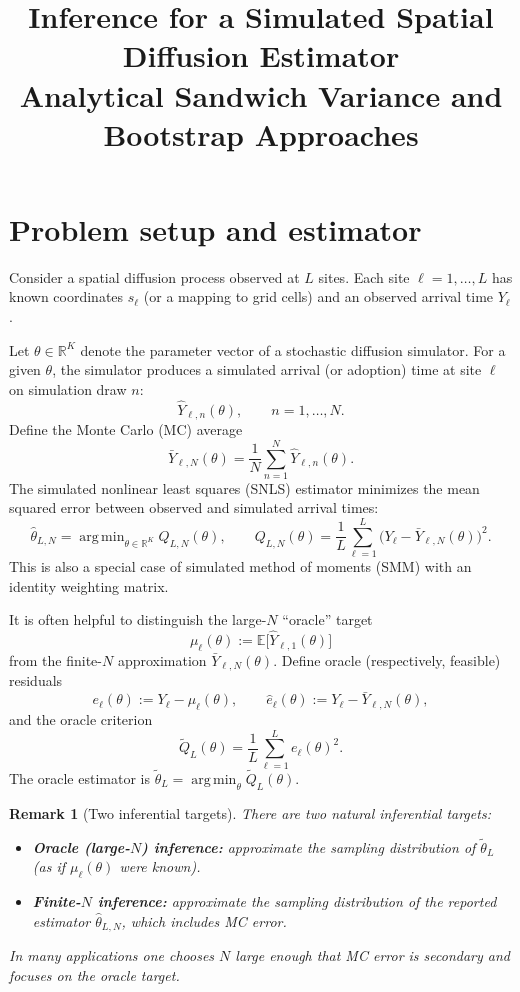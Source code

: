 \documentclass[11pt]{article}
\title{\textbf{Inference for a Simulated Spatial Diffusion Estimator}\\[0.35em]
\large Analytical Sandwich Variance and Bootstrap Approaches}
\author{}
\date{}
\newtheorem{remark}{Remark}
\DeclareMathOperator*{\argmin}{arg\,min}
\newcommand{\E}{\mathbb{E}}
\newcommand{\R}{\mathbb{R}}
\begin{document}
\maketitle
\tableofcontents
\bigskip

\section{Problem setup and estimator}

Consider a spatial diffusion process observed at $L$ sites. Each site
$\ell = 1, \ldots, L$ has known coordinates $s_\ell$ (or a mapping to grid
cells) and an observed arrival time $Y_\ell$.

Let $\theta \in \R^K$ denote the parameter vector of a stochastic diffusion
simulator. For a given $\theta$, the simulator produces a simulated arrival
(or adoption) time at site $\ell$ on simulation draw $n$:
\[
\hat Y_{\ell,n}(\theta), \qquad n=1,\ldots,N.
\]
Define the Monte Carlo (MC) average
\begin{equation}
\bar Y_{\ell,N}(\theta)
= \frac{1}{N}\sum_{n=1}^N \hat Y_{\ell,n}(\theta).
\label{eq:mcavg}
\end{equation}
The simulated nonlinear least squares (SNLS) estimator minimizes the mean
squared error between observed and simulated arrival times:
\begin{equation}
\hat\theta_{L,N}
= \argmin_{\theta \in \R^K}
Q_{L,N}(\theta),
\qquad
Q_{L,N}(\theta)
= \frac{1}{L}\sum_{\ell=1}^L \bigl(Y_\ell - \bar Y_{\ell,N}(\theta)\bigr)^2.
\label{eq:criterion}
\end{equation}
This is also a special case of simulated method of moments (SMM) with an
identity weighting matrix.

It is often helpful to distinguish the large-$N$ ``oracle'' target
\[
\mu_\ell(\theta) := \E\bigl[\hat Y_{\ell,1}(\theta)\bigr]
\]
from the finite-$N$ approximation $\bar Y_{\ell,N}(\theta)$. Define oracle
(respectively, feasible) residuals
\[
 e_\ell(\theta) := Y_\ell - \mu_\ell(\theta),
\qquad
 \hat e_\ell(\theta) := Y_\ell - \bar Y_{\ell,N}(\theta),
\]
and the oracle criterion
\[
\tilde Q_L(\theta) = \frac{1}{L}\sum_{\ell=1}^L e_\ell(\theta)^2.
\]
The oracle estimator is $\tilde\theta_L = \argmin_{\theta} \tilde Q_L(\theta)$.

\begin{remark}[Two inferential targets]
There are two natural inferential targets:
\begin{itemize}
  \item \textbf{Oracle (large-$N$) inference:} approximate the sampling distribution
        of $\tilde\theta_L$ (as if $\mu_\ell(\theta)$ were known).
  \item \textbf{Finite-$N$ inference:} approximate the sampling distribution of the
        reported estimator $\hat\theta_{L,N}$, which includes MC error.
\end{itemize}
In many applications one chooses $N$ large enough that MC error is secondary
and focuses on the oracle target.
\end{remark}
\end{document}

